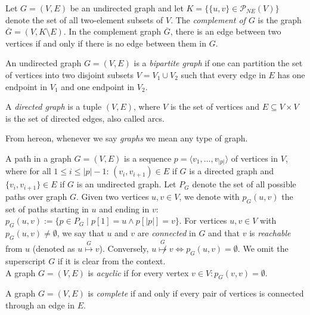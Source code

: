 \begin{definition}\label{def: complement graph}
Let $G=(V,E)$ be an undirected graph and let 
$K = \{ \{u,v\} \in \mathcal{P}_{NE}(V)\}$ 
denote the set of all two-element subsets of $V$.
The \emph{complement of $G$} is the graph $\overline{G}=(V,K \setminus E)$.
In the complement graph $\overline{G}$, there is an edge between two vertices if and only if there is no edge between them in $G$.
\end{definition}



\begin{definition}
An undirected graph $G=(V,E)$ is a \emph{bipartite graph} if one can partition the set of vertices into two disjoint subsets $V=V_1 \cup V_2$ such that every edge in $E$ has one endpoint in $V_1$ and one endpoint in $V_2$.
\end{definition}


\begin{definition}
A \emph{directed graph} is a tuple $(V,E)$, where $V$ is the set of vertices and $E \subseteq V \times V$ is the set of directed edges, also called arcs.
\end{definition}

From hereon, whenever we say \textit{graphs} we mean any type of graph.


\begin{definition}
A path in a graph $G=(V,E)$ is a sequence 
$p=\langle v_1,...,v_{|p|} \rangle$ of vertices in $V$, where for all $1 \leq i \leq |p|-1$:
$(v_i,v_{i+1}) \in E$ if $G$ is a directed graph and $\{v_i,v_{i+1}\} \in E$ if $G$ is an undirected graph.
Let $P_G$ denote the set of all possible paths over graph $G$.
Given two vertices $u,v \in V$, we denote with $p_G(u,v)$ the set of paths starting in $u$ and ending in $v$:
$p_G(u,v):= \{p \in P_G \mid p[1]=u \wedge p[|p|]=v\}$.
For vertices $u,v \in V$ with $p_G(u,v) \neq \emptyset$, we say that $u$ and $v$ are \emph{connected} in $G$ and that $v$ is \emph{reachable} from $u$ (denoted as $u \overset{G}{\mapsto} v$).
Conversely, $u \overset{G}{\not \mapsto} v \Leftrightarrow p_G(u,v) = \emptyset$.
We omit the superscript $G$ if it is clear from the context.\\
A graph $G=(V,E)$ is \emph{acyclic} if for every vertex $v \in V: p_G(v,v)=\emptyset$.
\end{definition}


\begin{definition}
A graph $G=(V,E)$ is \emph{complete} if and only if every pair of vertices is connected through an edge in $E$.
\end{definition}


